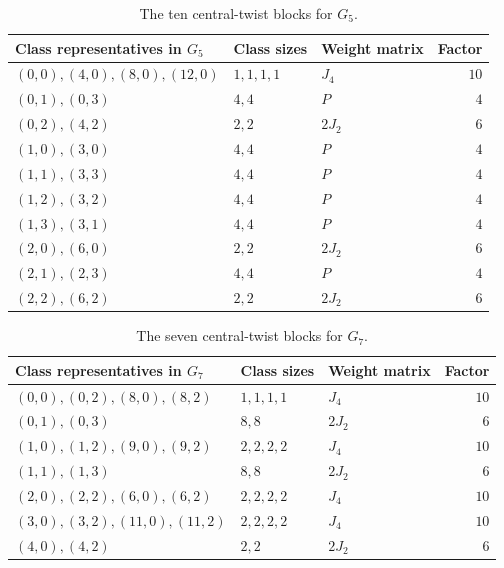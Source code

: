 \documentclass[11pt]{article}
\begin{document}
\begin{table}[htbp]\centering\small
\begin{tabular}{@{}lll r@{}}\toprule
Class representatives in $G_5$ & Class sizes & Weight matrix & Factor\\\midrule
$(0,0),(4,0),(8,0),(12,0)$ & $1,1,1,1$ & $J_4$ & $10$\\
$(0,1),(0,3)$ & $4,4$ & $P$ & $4$\\
$(0,2),(4,2)$ & $2,2$ & $2J_2$ & $6$\\
$(1,0),(3,0)$ & $4,4$ & $P$ & $4$\\
$(1,1),(3,3)$ & $4,4$ & $P$ & $4$\\
$(1,2),(3,2)$ & $4,4$ & $P$ & $4$\\
$(1,3),(3,1)$ & $4,4$ & $P$ & $4$\\
$(2,0),(6,0)$ & $2,2$ & $2J_2$ & $6$\\
$(2,1),(2,3)$ & $4,4$ & $P$ & $4$\\
$(2,2),(6,2)$ & $2,2$ & $2J_2$ & $6$\\\bottomrule
\end{tabular}
\caption{The ten central-twist blocks for $G_5$.}\label{tab:five}
\end{table}

\begin{table}[htbp]\centering\small
\begin{tabular}{@{}lll r@{}}\toprule
Class representatives in $G_7$ & Class sizes & Weight matrix & Factor\\\midrule
$(0,0),(0,2),(8,0),(8,2)$ & $1,1,1,1$ & $J_4$ & $10$\\
$(0,1),(0,3)$ & $8,8$ & $2J_2$ & $6$\\
$(1,0),(1,2),(9,0),(9,2)$ & $2,2,2,2$ & $J_4$ & $10$\\
$(1,1),(1,3)$ & $8,8$ & $2J_2$ & $6$\\
$(2,0),(2,2),(6,0),(6,2)$ & $2,2,2,2$ & $J_4$ & $10$\\
$(3,0),(3,2),(11,0),(11,2)$ & $2,2,2,2$ & $J_4$ & $10$\\
$(4,0),(4,2)$ & $2,2$ & $2J_2$ & $6$\\\bottomrule
\end{tabular}
\caption{The seven central-twist blocks for $G_7$.}\label{tab:seven}
\end{table}
\end{document}

